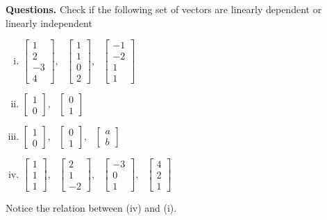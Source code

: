 \documentclass{article}
\begin{document}
\textbf{Questions.} Check if the following set of vectors are linearly dependent or linearly independent\\
\begin{enumerate} [i.]
    \item $ \begin{bmatrix}1\\2\\-3\\4 \end{bmatrix},~~~
        \begin{bmatrix}1\\1\\0\\2 \end{bmatrix} ,~~~
        \begin{bmatrix}-1\\-2\\1\\1\end{bmatrix} $
    \item $ \begin{bmatrix}1\\0\end{bmatrix},~~~
        \begin{bmatrix}0\\1 \end{bmatrix} $
    \item  $\begin{bmatrix}1\\0 \end{bmatrix},~~~
        \begin{bmatrix}0\\1\end{bmatrix} ,~~~
        \begin{bmatrix}a\\b\end{bmatrix} $
    \item $ \begin{bmatrix}1\\1\\1\end{bmatrix},~~~
        \begin{bmatrix}2\\1\\-2\end{bmatrix} ,~~~
        \begin{bmatrix}-3\\0\\1\end{bmatrix} ,~~~ 
        \begin{bmatrix}4\\2\\1\end{bmatrix} $ 
\end{enumerate}
Notice the relation between (iv) and (i).
\end{document}
